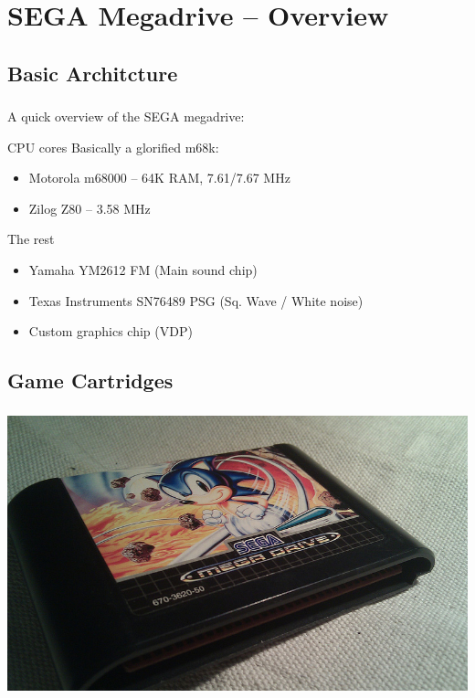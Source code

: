 \documentclass{beamer}
\begin{document}

\section{SEGA Megadrive -- Overview}
\subsection{Basic Architcture}

\begin{frame}[fragile]
\frametitle{\insertsubsection}

A quick overview of the SEGA megadrive:

\begin{block}{CPU cores}
Basically a glorified m68k:

\begin{itemize}
\item Motorola m68000 -- 64K RAM, 7.61/7.67 MHz
\item Zilog Z80 -- 3.58 MHz
\end{itemize}
\end{block}

\vfill

\begin{block}{The rest}
\begin{itemize}
\item Yamaha YM2612 FM (Main sound chip)
\item Texas Instruments SN76489 PSG (Sq. Wave / White noise)
\item Custom graphics chip (VDP)
\end{itemize}
\end{block}

\end{frame}


\subsection{Game Cartridges}

\begin{frame}[fragile]
\frametitle{\insertsubsection}

\begin{center}
\includegraphics[height=0.7\textheight]{img/cart.jpg}
\end{center}

\end{frame}
\end{document}
